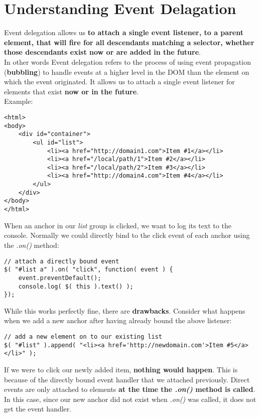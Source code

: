 \documentclass[10pt,letterpaper]{report}
\begin{document}
\section{Understanding Event Delagation}
Event delegation allows us \textbf{to attach a single event listener, to a parent element, that will fire for all descendants matching a selector, whether those descendants exist now or are added in the future}.\\
In other words Event delegation refers to the process of using event propagation (\textbf{bubbling}) to handle events at a higher level in the DOM than the element on which the event originated. It allows us to attach a single event listener for elements that exist \textbf{now or in the future}.\\
Example:
\lstset{language=HTML} 
\begin{lstlisting}
<html>
<body>
	<div id="container">
		<ul id="list">
			<li><a href="http://domain1.com">Item #1</a></li>
			<li><a href="/local/path/1">Item #2</a></li>
			<li><a href="/local/path/2">Item #3</a></li>
			<li><a href="http://domain4.com">Item #4</a></li>
		</ul>
	</div>
</body>
</html>
\end{lstlisting}
When an anchor in our \textit{\textdollar list} group is clicked, we want to log its text to the console. Normally we could directly bind to the click event of each anchor using the \textit{.on()} method:
\lstset{language=JavaScript}
\begin{lstlisting}
// attach a directly bound event
$( "#list a" ).on( "click", function( event ) {
	event.preventDefault();
	console.log( $( this ).text() );
});
\end{lstlisting}
While this works perfectly fine, there are \textbf{drawbacks}. Consider what happens when we add a new anchor after having already bound the above listener:
\begin{lstlisting}
// add a new element on to our existing list
$( "#list" ).append( "<li><a href='http://newdomain.com'>Item #5</a></li>" );
\end{lstlisting}
If we were to click our newly added item, \textbf{nothing would happen}. This is because of the directly bound event handler that we attached previously. Direct events are only attached to elements \textbf{at the time the \textit{.on()} method is called}. In this case, since our new anchor did not exist when \textit{.on()} was called, it does not get the event handler.
\end{document}
